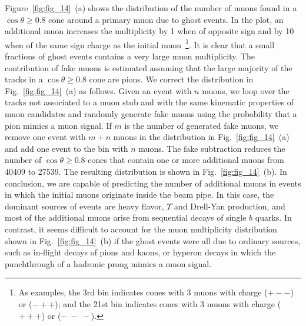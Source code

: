 \documentclass[aps,prd,preprint,floatfix,nofootinbib,superscriptaddress,showpacs,amssymb]{revtex4}
\begin{document}
 Figure~\ref{fig:fig_14}~(a) shows the distribution of the number of muons
 found in a $\cos\theta \geq 0.8$ cone around a primary muon due to ghost 
 events. In the plot, an additional muon increases the multiplicity by 1 
 when of opposite sign and by 10 when of the same sign charge as the initial
 muon~\footnote{
 As examples, the 3rd bin indicates cones with 3 muons with charge ($+--$)
 or ($-++$); and the 21st bin indicates cones with  3 muons with charge
 ($+++$) or ($-\:-\:-$).}.
 It is clear that a small fractions of ghost events contains a very large
 muon multiplicity.  The contribution of fake muons is  estimated assuming
 that the large majority of the tracks in a $\cos \theta \geq 0.8$ cone 
 are pions. We correct the distribution in Fig.~\ref{fig:fig_14}~(a) as
 follows. Given an event with $n$ muons, we loop over the tracks not 
 associated to a muon stub and with the same kinematic properties of muon
 candidates and randomly generate fake muons using the probability that
 a pion mimics a muon signal. If $m$ is the number of generated fake muons,
 we remove one event with $m+n$ muons in the distribution in 
 Fig.~\ref{fig:fig_14}~(a) and add one event to the bin with $n$ muons.
 The fake subtraction reduces the number of  $\cos \theta \geq 0.8$ cones 
 that contain one or more additional muons from 40409 to 27539.
 The resulting distribution is shown in Fig.~\ref{fig:fig_14}~(b).
 In conclusion, we are capable of predicting the number of additional
 muons in events in which the initial muons originate inside the beam pipe.
 In this case, the dominant sources of events are heavy flavor, $\Upsilon$
 and Drell-Yan production, and most of the additional muons arise from 
 sequential decays of single $b$ quarks.
 In contrast,  it seems difficult to account for the muon multiplicity
 distribution shown in Fig.~\ref{fig:fig_14}~(b)
 if the ghost events were  all due to ordinary sources, such as in-flight decays of pions and kaons,
 or hyperon decays in which the punchthrough of a hadronic prong mimics
 a muon signal.
\end{document}
